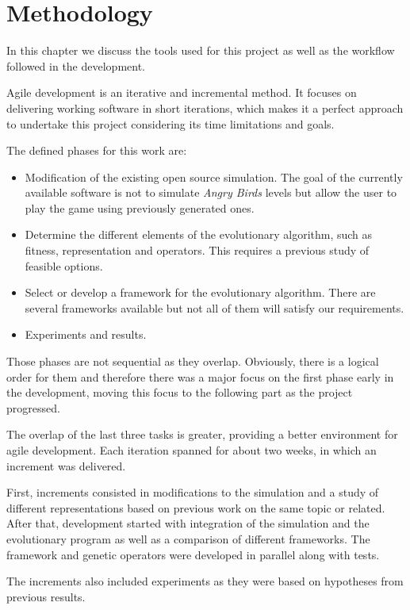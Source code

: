 \chapter{Methodology}\label{ch:workflow}

In this chapter we discuss the tools used for this project as well as the workflow followed in the development. 

Agile development is an iterative and incremental method. It focuses on delivering working software in short iterations, which makes it a perfect approach to undertake this project considering its time limitations and goals.

The defined phases for this work are:
\begin{itemize}
	\item Modification of the existing open source simulation. The goal of the currently available software is not to simulate \textit{Angry Birds} levels but allow the user to play the game using previously generated ones. 
	\item Determine the different elements of the evolutionary algorithm, such as fitness, representation and operators. This requires a previous study of feasible options. 
	\item Select or develop a framework for the evolutionary algorithm. There are several frameworks available but not all of them will satisfy our requirements. 
	\item Experiments and results.
\end{itemize}

Those phases are not sequential as they overlap. Obviously, there is a logical order for them and therefore there was a major focus on the first phase early in the development, moving this focus to the following part as the project progressed. 

The overlap of the last three tasks is greater, providing a better environment for agile development. Each iteration spanned for about two weeks, in which an increment was delivered.

First, increments consisted in modifications to the simulation and a study of different representations based on previous work on the same topic or related. After that, development started with integration of the simulation and the evolutionary program as well as a comparison of different frameworks. The framework and genetic operators were developed in parallel along with tests.

The increments also included experiments as they were based on hypotheses from previous results. 

